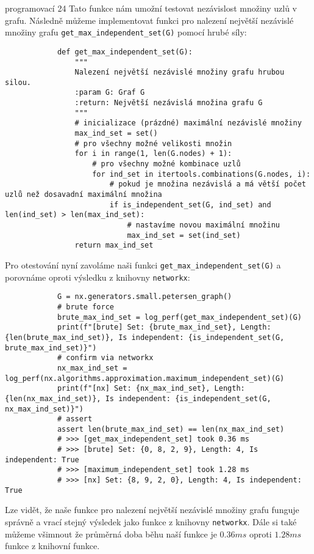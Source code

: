 \documentclass[10pt, a4paper]{ReportSheet}
\begin{document}
\begin{uloha}{programovací 2}{4}
        Tato funkce nám umožní testovat nezávislost množiny uzlů v grafu. Následně můžeme implementovat funkci pro
        nalezení největší nezávislé množiny grafu \texttt{get\_max\_independent\_set(G)} pomocí hrubé síly:
        \begin{verbatim}
            def get_max_independent_set(G):
                """
                Nalezení největší nezávislé množiny grafu hrubou silou.
                :param G: Graf G
                :return: Největší nezávislá množina grafu G
                """
                # inicializace (prázdné) maximální nezávislé množiny
                max_ind_set = set()
                # pro všechny možné velikosti množin
                for i in range(1, len(G.nodes) + 1):
                    # pro všechny možné kombinace uzlů
                    for ind_set in itertools.combinations(G.nodes, i):
                        # pokud je množina nezávislá a má větší počet uzlů než dosavadní maximální množina
                        if is_independent_set(G, ind_set) and len(ind_set) > len(max_ind_set):
                            # nastavíme novou maximální množinu
                            max_ind_set = set(ind_set)
                return max_ind_set
        \end{verbatim}

        \clearpage
        Pro otestování nyní zavoláme naši funkci \texttt{get\_max\_independent\_set(G)} a porovnáme oproti výsledku z
        knihovny \texttt{networkx}:
        \begin{verbatim}
            G = nx.generators.small.petersen_graph()
            # brute force
            brute_max_ind_set = log_perf(get_max_independent_set)(G)
            print(f"[brute] Set: {brute_max_ind_set}, Length: {len(brute_max_ind_set)}, Is independent: {is_independent_set(G, brute_max_ind_set)}")
            # confirm via networkx
            nx_max_ind_set = log_perf(nx.algorithms.approximation.maximum_independent_set)(G)
            print(f"[nx] Set: {nx_max_ind_set}, Length: {len(nx_max_ind_set)}, Is independent: {is_independent_set(G, nx_max_ind_set)}")
            # assert
            assert len(brute_max_ind_set) == len(nx_max_ind_set)
            # >>> [get_max_independent_set] took 0.36 ms
            # >>> [brute] Set: {0, 8, 2, 9}, Length: 4, Is independent: True
            # >>> [maximum_independent_set] took 1.28 ms
            # >>> [nx] Set: {8, 9, 2, 0}, Length: 4, Is independent: True
        \end{verbatim}

        Lze vidět, že naše funkce pro nalezení největší nezávislé množiny grafu funguje správně a vrací stejný výsledek
        jako funkce z knihovny \texttt{networkx}. Dále si také můžeme všimnout že průměrná doba běhu naší funkce je $0
        .36ms$ oproti $1.28ms$ funkce z knihovní funkce.


\end{uloha}
\end{document}
